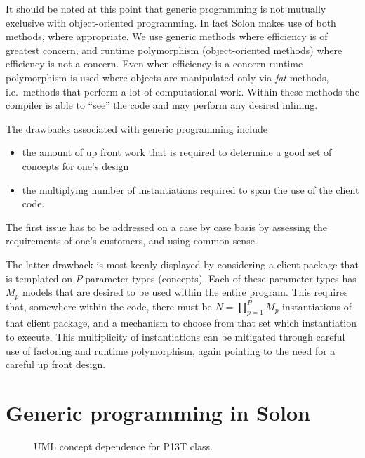 \documentclass[reqno]{lanl}
\begin{document}
It should be noted at this point that generic programming is not
mutually exclusive with object-oriented programming.
In fact Solon makes use of both methods, where appropriate.
We use generic methods where efficiency is of greatest concern, and
runtime polymorphism (object-oriented methods) where efficiency is not
a concern.
Even when efficiency is a concern runtime polymorphism is used where
objects are manipulated only
via \emph{fat} methods, i.e.\ methods that perform
a lot of computational work.
Within these methods the compiler is able to ``see'' the code and may
perform any desired inlining.

The drawbacks associated with generic programming include
\begin{itemize}
\item the amount of up front work that is required to
      determine a good set of concepts for one's design
\item the multiplying number of instantiations required to
      span the use of the client code.
\end{itemize}

The first issue has to be addressed on a case by case basis by assessing
the requirements of one's customers, and using common sense.

The latter drawback is most keenly displayed by considering a client package
that is templated on $P$ parameter types (concepts).
Each of these parameter types has $M_{p}$ models that are desired to be
used within the entire program.
This requires that, somewhere within the code, there must be
$N = \prod_{p=1}^{P} M_{p}$ instantiations of that client package, and a
mechanism to choose from that set which instantiation to execute.
This multiplicity of instantiations can be mitigated through careful
use of factoring and runtime polymorphism,
again pointing to the need for a careful up front design.

\section{Generic programming in Solon}

\begin{figure}
\caption{UML concept dependence for P13T class.}
\label{fig:p13t_uml}
\end{figure}
\end{document}
